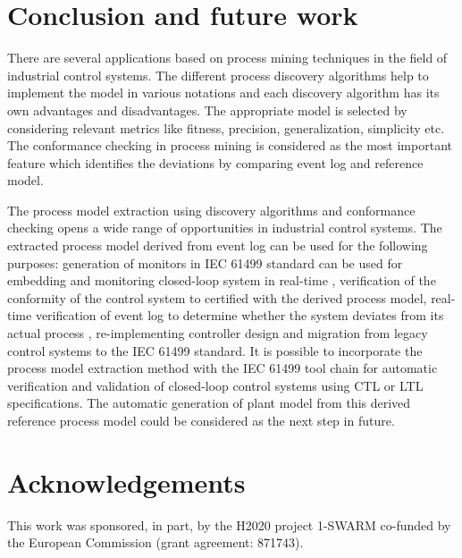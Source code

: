 \begin{bibunit}
   \section{Conclusion and future work}
   \label{sec:conclusion}
   There are several applications based on process mining techniques in the field of industrial control systems. The different process discovery algorithms help to implement the model in various notations and each discovery algorithm has its own advantages and disadvantages. The appropriate model is selected by considering relevant metrics like fitness, precision, generalization, simplicity etc. The conformance checking in process mining is considered as the most important feature which identifies the deviations by comparing event log and reference model.
   
   The process model extraction using discovery algorithms and conformance checking opens a wide range of opportunities in industrial control systems. The extracted process model derived from event log can be used for the following purposes: generation of monitors in IEC 61499 standard can be used for embedding and monitoring closed-loop system in real-time \cite{wenger2015behavioral}, verification of the conformity of the control system to certified with the derived process model, real-time verification of event log to determine whether the system deviates from its actual process , re-implementing controller design and migration from legacy control systems to the IEC 61499 standard. It is possible to incorporate the process model extraction method with the IEC 61499 tool chain \cite{xavier2021cyber} for automatic verification and validation of closed-loop control systems using CTL or LTL specifications. 
   The automatic generation of plant model  from this derived reference process model could be considered as the next step in future.
   
   \section{Acknowledgements}
   This work was sponsored, in part, by the H2020 project 1-SWARM co-funded by the European Commission (grant agreement: 871743).  
   
\putbib
\end{bibunit} 